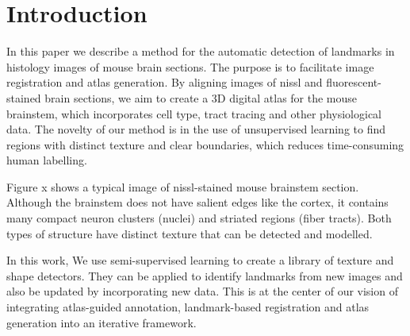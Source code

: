 \documentclass{llncs}
\begin{document}
\section{Introduction}

In this paper we describe a method for the automatic detection of landmarks in histology images of mouse brain sections. The purpose is to facilitate image registration and atlas generation. By aligning images of nissl and fluorescent-stained brain sections, we aim to create a 3D digital atlas for the mouse brainstem, which incorporates cell type, tract tracing and other physiological data. The novelty of our method is in the use of unsupervised learning to find regions with distinct texture and clear boundaries, which reduces time-consuming human labelling.

Figure x shows a typical image of nissl-stained mouse brainstem section. Although the brainstem does not have salient edges like the cortex, it contains many compact neuron clusters (nuclei) and striated regions (fiber tracts). Both types of structure have distinct texture that can be detected and modelled.

In this work, We use semi-supervised learning to create a library of texture and shape detectors. They can be applied to identify landmarks from new images and also be updated by incorporating new data. This is at the center of our vision of integrating atlas-guided annotation, landmark-based registration and atlas generation into an iterative framework.





\end{document}
